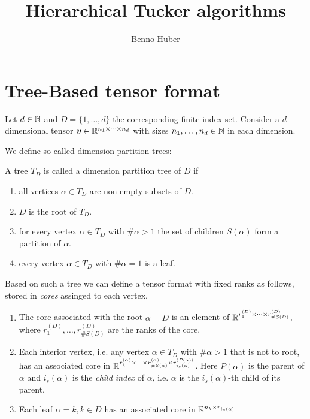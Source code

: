 \documentclass[a4wide]{article}
\title{Hierarchical Tucker algorithms}
\author{Benno Huber}
\begin{document}
\maketitle

\section{Tree-Based tensor format}

Let $d \in \mathbb{N}$ and $D = \{1,\dots, d\}$ the corresponding finite index set.
Consider a $d$-dimensional tensor ${\boldsymbol{v}} \in \mathbb{R}^{n_1 \times \dots \times n_d}$ with sizes $n_1, \dots, n_d \in \mathbb{N}$ in each dimension.

We define so-called dimension partition trees:

\begin{definition}
  A tree $T_D$ is called a dimension partition tree of $D$ if
  \begin{enumerate}
    \item all vertices $\alpha \in T_D$ are non-empty subsets of $D$.
    \item $D$ is the root of $T_D$.
    \item for every vertex $\alpha \in T_D$ with $\# \alpha > 1$ the set of children $S(\alpha)$ form a partition of $\alpha$.
    \item every vertex $\alpha \in T_D$ with $\# \alpha = 1$ is a leaf.
  \end{enumerate}
\end{definition}

Based on such a tree we can define a tensor format with fixed ranks as follows, stored in \emph{cores} assinged to each vertex.

\begin{enumerate}
  \item The core associated with the root $\alpha = D$ is an element of $\mathbb{R}^{r_{1}^{(D)} \times \dots \times r_{\# S(D)}^{(D)}}$, where $r_{1}^{(D)}, \dots, r_{\# S(D)}^{(D)}$ are the ranks of the core.
  
  \item Each interior vertex, i.e. any vertex $\alpha \in T_D$ with $\# \alpha > 1$ that is not to root, has an associated core in $\mathbb{R}^{r_{1}^{(\alpha)} \times \dots \times r_{\# S(\alpha)}^{(\alpha)} \times r_{i_s(\alpha)}^{(P(\alpha))}}$.
  Here $P(\alpha)$ is the parent of $\alpha$ and $i_s(\alpha)$ is the \emph{child index} of $\alpha$, i.e. 
  $\alpha$ is the $i_s(\alpha)$-th child of its parent.

  \item Each leaf $\alpha = {k}, k \in D$ has an associated core in $\mathbb{R}^{n_k \times r_{i_s(\alpha)}}$
\end{enumerate}
\end{document}
